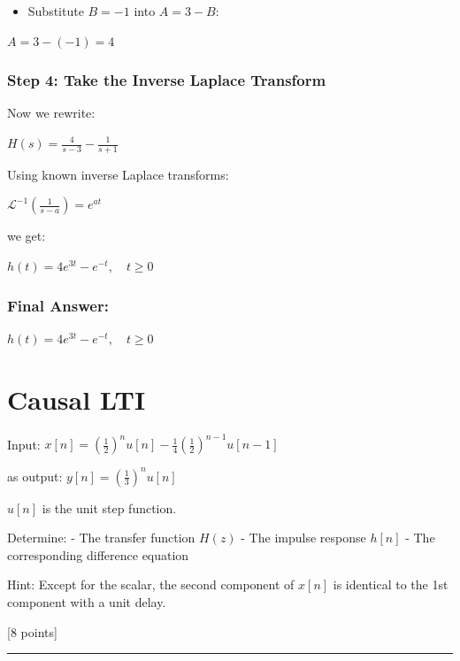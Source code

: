 \documentclass[11pt]{article}
\providecommand{\tightlist}{%
      \setlength{\itemsep}{0pt}\setlength{\parskip}{0pt}}
\begin{document}
\begin{itemize}
\tightlist
\item
  Substitute \(B = -1\) into \(A = 3 - B\):
\end{itemize}

\(A = 3 - (-1) = 4\)

\subsubsection{\texorpdfstring{\textbf{Step 4: Take the Inverse Laplace
Transform}}{Step 4: Take the Inverse Laplace Transform}}\label{step-4-take-the-inverse-laplace-transform}

Now we rewrite:

\(H(s) = \frac{4}{s - 3} - \frac{1}{s + 1}\)

Using known inverse Laplace transforms:

\(\mathcal{L}^{-1} \left( \frac{1}{s - a} \right) = e^{at}\)

we get:

\(h(t) = 4e^{3t} - e^{-t}, \quad t \geq 0\)

\subsubsection{\texorpdfstring{\textbf{Final
Answer:}}{Final Answer:}}\label{final-answer}

\(h(t) = 4e^{3t} - e^{-t}, \quad t \geq 0\)

    \section{\texorpdfstring{\textbf{Causal
LTI}}{Causal LTI}}\label{causal-lti}

Input:
\(x[n] = \left(\frac{1}{2}\right)^n u[n] - \frac{1}{4} \left( \frac{1}{2}\right)^{n-1} u[n-1]\)

as output: \(y[n] = \left(\frac{1}{3}\right)^n u[n]\)

\(u[n]\) is the unit step function.

Determine: - The transfer function \(H(z)\) - The impulse response
\(h[n]\) - The corresponding difference equation

Hint: Except for the scalar, the second component of \(x[n]\) is
identical to the 1st component with a unit delay.

{[}8 points{]}

    \begin{center}\rule{0.5\linewidth}{0.5pt}\end{center}
\end{document}
